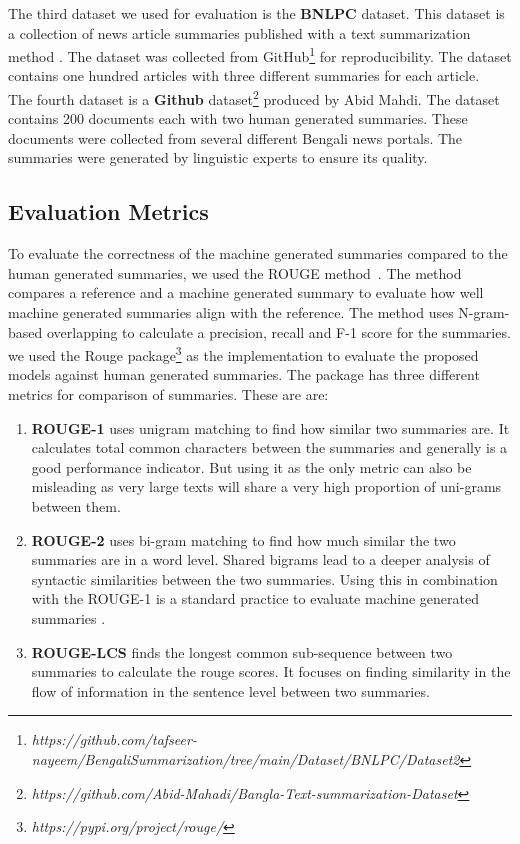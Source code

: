 The third dataset we used for evaluation is the \textbf{BNLPC} \cite{Hque-2015-BNLPC-Dataset} dataset. This dataset is a collection of news article summaries published with a text summarization method \cite{Hque-2015-BNLPC-Dataset}. The dataset was collected from GitHub\footnote{\textit{https://github.com/tafseer-nayeem/BengaliSummarization/tree/main/Dataset/BNLPC/Dataset2}} for reproducibility. The dataset contains one hundred articles with three different summaries for each article.\\

The fourth dataset is a \textbf{Github} dataset\footnote{\textit{https://github.com/Abid-Mahadi/Bangla-Text-summarization-Dataset}} produced by Abid Mahdi. The dataset contains 200 documents each with two human generated summaries. These documents were collected from several different Bengali news portals. The summaries were generated by linguistic experts to ensure its quality.

\subsection{Evaluation Metrics}\label{subsec:evaluation-metrics}
To evaluate the correctness of the machine generated summaries compared to the human generated summaries, we used the ROUGE method~\cite{lin-2004-rouge}. The method compares a reference and a machine generated summary to evaluate how well machine generated summaries align with the reference. The method uses N-gram-based overlapping to calculate a precision, recall and F-1 score for the summaries. we used the Rouge package\footnote{\textit{https://pypi.org/project/rouge/}} as the implementation to evaluate the proposed models against human generated summaries. The package has three different metrics for comparison of summaries. These are are:

\begin{enumerate}
    \item \textbf{ROUGE-1} uses unigram matching to find how similar two summaries are. It calculates total common characters between the summaries and generally is a good performance indicator. But using it as the only metric can also be misleading as very large texts will share a very high proportion of uni-grams between them.
    \item \textbf{ROUGE-2} uses bi-gram matching to find how much similar the two summaries are in a word level. Shared bigrams lead to a deeper analysis of syntactic similarities between the two summaries. Using this in combination with the ROUGE-1 is a standard practice to evaluate machine generated summaries \cite{wafaa-2021-summary-comprehensive-review}.
    \item \textbf{ROUGE-LCS} finds the longest common sub-sequence between two summaries to calculate the rouge scores. It focuses on finding similarity in the flow of information in the sentence level between two summaries.
\end{enumerate}

